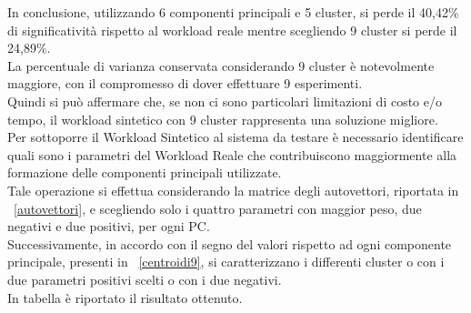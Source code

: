 In conclusione, utilizzando 6 componenti principali e 5 cluster, si perde il 40,42\%
di significatività rispetto al workload reale mentre scegliendo 9 cluster si perde il 24,89\%.\\
La percentuale di varianza conservata considerando 9 cluster è notevolmente maggiore,
con il compromesso di dover effettuare 9 esperimenti.\\
Quindi si può affermare che, se non ci sono particolari limitazioni di costo e/o tempo,
il workload sintetico con 9 cluster rappresenta una soluzione migliore.\\
Per sottoporre il Workload Sintetico al sistema da testare è necessario identificare
quali sono i parametri del Workload Reale che contribuiscono maggiormente
alla formazione delle componenti principali utilizzate.\\
Tale operazione si effettua considerando la matrice degli autovettori, riportata
in \figurename~\ref{autovettori}, e scegliendo solo i quattro parametri con maggior
peso, due negativi e due positivi, per ogni PC.\\
Successivamente, in accordo con il segno del valori rispetto ad ogni componente
principale, presenti in \figurename~\ref{centroidi9}, si caratterizzano i
differenti cluster o con i due parametri positivi scelti o con i due negativi.\\
In tabella è riportato il risultato ottenuto.
